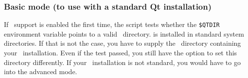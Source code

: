 \subsubsection{Basic mode (to use with a standard Qt installation)}

If \qt\ support is enabled the first time, the script tests whether
the \texttt{\$QTDIR} environment variable points to a valid \qt\ 
directory.  is installed in standard system directories. If that is
not the case, you have to supply the \qt\ directory containing your
\qt\ installation.  Even if the test passed, you still have the option
to set this directory differently.  If your \qt\ installation is not
standard, you would have to go into the advanced mode.\bigskip



